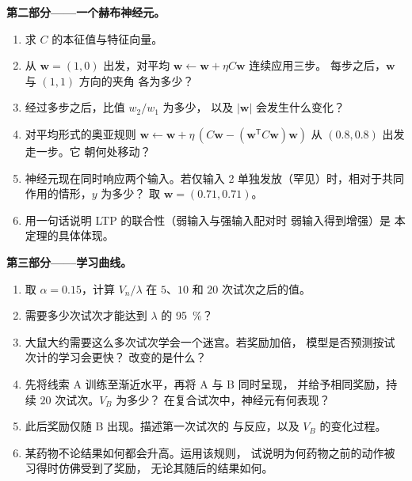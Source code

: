 \begin{problem}
\medskip
\noindent\textbf{第二部分——一个赫布神经元。}
\begin{enumerate}[resume]
  \item 求 $C$ 的本征值与特征向量。
  \item 从 $\mathbf{w} = (1, 0)$ 出发，对平均 $\mathbf{w} \leftarrow \mathbf{w} + \eta C\mathbf{w}$ 连续应用三步。
        每步之后，$\mathbf{w}$ 与 $(1,1)$ 方向的夹角
        各为多少？
  \item 经过多步之后，比值 $w_{2}/w_{1}$ 为多少，
        以及 $|\mathbf{w}|$ 会发生什么变化？
  \item 对平均形式的奥亚规则 $\mathbf{w} \leftarrow \mathbf{w} +
        \eta\,(C\mathbf{w} - (\mathbf{w}^{\mathsf{T}}C\mathbf{w})
        \mathbf{w})$ 从 $(0.8, 0.8)$ 出发走一步。它
        朝何处移动？
  \item 神经元现在同时响应两个输入。若仅输入 2
        单独发放（罕见）时，相对于共同作用的情形，$y$ 为多少？
        取 $\mathbf{w} = (0.71, 0.71)$。
  \item 用一句话说明 LTP 的联合性（弱输入与强输入配对时
        弱输入得到增强）是
        本定理的具体体现。
\end{enumerate}

\medskip
\noindent\textbf{第三部分——学习曲线。}
\begin{enumerate}[resume]
  \item 取 $\alpha = 0.15$，计算 $V_{n}/\lambda$ 在 $5$、$10$
        和 $20$ 次试次之后的值。
  \item 需要多少次试次才能达到 $\lambda$ 的 \qty{95}{\%}？
  \item 大鼠大约需要这么多次试次学会一个迷宫。若奖励加倍，
        模型是否预测按试次计的学习会更快？
        改变的是什么？
  \item 先将线索 A 训练至渐近水平，再将 A 与 B 同时呈现，
        并给予相同奖励，持续 $20$ 次试次。$V_{B}$ 为多少？
        在复合试次中，神经元有何表现？
  \item 此后奖励仅随 B 出现。描述第一次试次的
        与反应，以及
        $V_{B}$ 的变化过程。
  \item 某药物不论结果如何都会升高。运用该规则，
        试说明为何药物之前的动作被习得时仿佛受到了奖励，
        无论其随后的结果如何。
\end{enumerate}


\end{problem}
